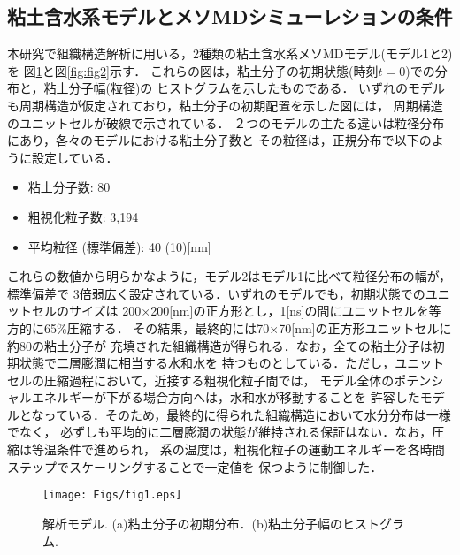 \subsection{粘土含水系モデルとメソMDシミューレションの条件}
本研究で組織構造解析に用いる，2種類の粘土含水系メソMDモデル(モデル1と2)を
図\ref{fig:fig1}と図\ref{fig:fig2}示す．
これらの図は，粘土分子の初期状態(時刻$t=0$)での分布と，粘土分子幅(粒径)の
ヒストグラムを示したものである．
いずれのモデルも周期構造が仮定されており，粘土分子の初期配置を示した図には，
周期構造のユニットセルが破線で示されている．
２つのモデルの主たる違いは粒径分布にあり，各々のモデルにおける粘土分子数と
その粒径は，正規分布で以下のように設定している．
\begin{itemize}
	\item 粘土分子数: 80
	\item 粗視化粒子数: 3,194
	\item 平均粒径 (標準偏差): 40 (10)[{\rm nm}]
\end{itemize}
これらの数値から明らかなように，モデル2はモデル1に比べて粒径分布の幅が，標準偏差で
3倍弱広く設定されている．いずれのモデルでも，初期状態でのユニットセルのサイズは
200$\times$200[nm]の正方形とし，1[ns]の間にユニットセルを等方的に65\%圧縮する．
その結果，最終的には70$\times$70[nm]の正方形ユニットセルに約80の粘土分子が
充填された組織構造が得られる．なお，全ての粘土分子は初期状態で二層膨潤に相当する水和水を
持つものとしている．ただし，ユニットセルの圧縮過程において，近接する粗視化粒子間では，
モデル全体のポテンシャルエネルギーが下がる場合方向へは，水和水が移動することを
許容したモデルとなっている．そのため，最終的に得られた組織構造において水分分布は一様でなく，
必ずしも平均的に二層膨潤の状態が維持される保証はない．なお，圧縮は等温条件で進められ，
系の温度は，粗視化粒子の運動エネルギーを各時間ステップでスケーリングすることで一定値を
保つように制御した．
\begin{figure}[h]
	\begin{center}
	\texttt{[image: Figs/fig1.eps]} 
	\end{center}
	\caption{
		解析モデル. (a)粘土分子の初期分布．(b)粘土分子幅のヒストグラム. 
	} 
	\label{fig:fig1}
\end{figure}
